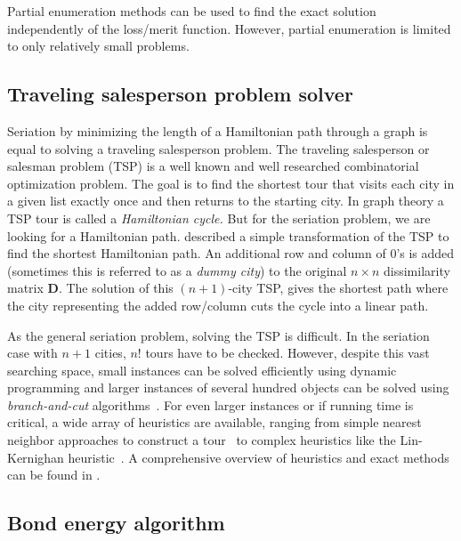 \documentclass[fleqn, a4paper]{article}
\begin{document}
Partial enumeration methods can be used to find the exact solution
independently of the loss/merit function. However, partial enumeration is
limited to only relatively small problems.

\subsection{Traveling salesperson problem solver}

Seriation by minimizing the length of a Hamiltonian path through a graph
is equal to solving a traveling salesperson problem.  The traveling
salesperson or salesman problem (TSP) is a well known and well
researched combinatorial optimization problem. The goal is to find the
shortest tour that visits each city in a given list exactly once and
then returns to the starting city. In graph theory a TSP tour is called
a \emph{Hamiltonian cycle.} But for the seriation problem, we are
looking for a Hamiltonian path. \cite{seriation:Garfinkel:1985}
described a simple transformation of the TSP to find the shortest
Hamiltonian path.  An additional row and column of 0's is added
(sometimes this is referred to as a \emph{dummy city}) to the original
$n \times n$ dissimilarity matrix $\mathbf{D}$.  The solution of this
$(n+1)$-city TSP, gives the shortest path where the city representing
the added row/column cuts the cycle into a linear path.

As the general seriation problem, solving the TSP is difficult.  In the
seriation case with $n+1$ cities, $n!$ tours have to be checked. However,
despite this vast searching space, small instances can be solved efficiently
using dynamic programming \citep{seriation:Held:1962} and larger instances of
several hundred objects can be solved using \emph{branch-and-cut}
algorithms~\citep{seriation:Padberg:1990}. For even larger instances or if
running time is critical, a wide array of heuristics are available, ranging
from simple nearest neighbor approaches to construct a
tour~\citep{seriation:Rosenkrantz:1977} to complex heuristics like the
Lin-Kernighan heuristic~\citep{seriation:Lin:1973}.  A comprehensive overview
of heuristics and exact methods can be found in \cite{seriation:Gutin:2002}.


\subsection{Bond energy algorithm}
\end{document}

